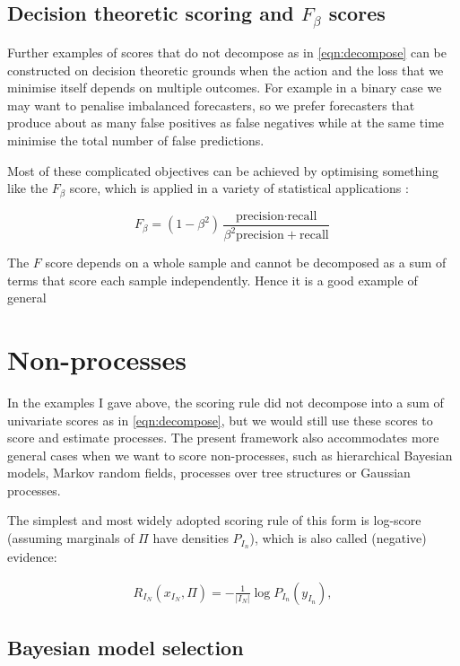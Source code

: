 \subsection{Decision theoretic scoring and $F_{\beta}$ scores}

Further examples of scores that do not decompose as in \eqref{eqn:decompose} can be constructed on decision theoretic grounds when the action and the loss that we minimise itself depends on multiple outcomes. For example in a binary case we may want to penalise imbalanced forecasters, so we prefer forecasters that produce about as many false positives as false negatives while at the same time minimise the total number of false predictions.

Most of these complicated objectives can be achieved by optimising something like the $F_{\beta}$ score, which is applied in a variety of statistical applications \citep{}:

\begin{equation}
	F_\beta = (1-\beta^2)\frac{\mbox{precision}\cdot\mbox{recall}}{\beta^2 \mbox{precision} + \mbox{recall}}
\end{equation}

The $F$ score depends on a whole sample and cannot be decomposed as a sum of terms that score each sample independently. Hence it is a good example of general

\section{Non-\iid processes}

In the examples I gave above, the scoring rule did not decompose into a sum of univariate scores as in \eqref{eqn:decompose}, but we would still use these scores to score and estimate \iid processes. The present framework also accommodates more general cases when we want to score non-\iid processes, such as hierarchical Bayesian models, Markov random fields, processes over tree structures or Gaussian processes.

The simplest and most widely adopted scoring rule of this form is log-score (assuming marginals of $\Pi$ have densities $P_{I_n}$), which is also called (negative) evidence:

\begin{align}
	R_{I_N}(x_{I_N},\Pi) = - \frac{1}{\vert I_N \vert}\log P_{I_n}(y_{I_n}),
\end{align}

\subsection{Bayesian model selection}

